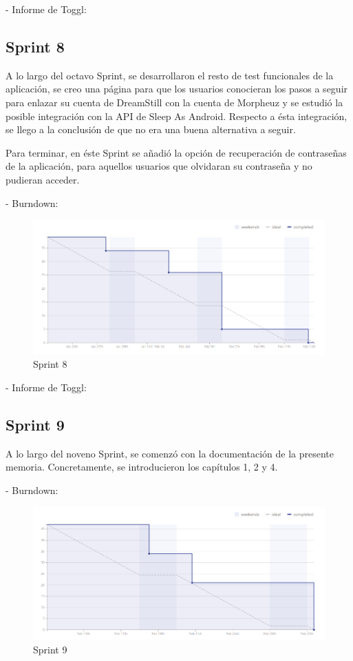 \documentclass[11pt,openany]{book}
\begin{document}
- Informe de Toggl:



\subsection{Sprint 8}

A lo largo del octavo Sprint, se desarrollaron el resto de test funcionales de la aplicación, se creo una página para que los usuarios conocieran los pasos a seguir para enlazar su cuenta de DreamStill con la cuenta de Morpheuz y se estudió la posible integración con la API de Sleep As Android. Respecto a ésta integración, se llego a la conclusión de que no era una buena alternativa a seguir. 

Para terminar, en éste Sprint se añadió la opción de recuperación de contraseñas de la aplicación, para aquellos usuarios que olvidaran su contraseña y no pudieran acceder.

- Burndown:

\begin{figure}[H]
\centering
\includegraphics[totalheight=7cm]{burndowns/Sprint8.png}
\caption{Sprint 8}
\end{figure}

- Informe de Toggl:



\subsection{Sprint 9}

A lo largo del noveno Sprint, se comenzó con la documentación de la presente memoria. Concretamente, se introducieron los capítulos 1, 2 y 4.

- Burndown:

\begin{figure}[H]
\centering
\includegraphics[totalheight=7cm]{burndowns/Sprint9.png}
\caption{Sprint 9}
\end{figure}
\end{document}
